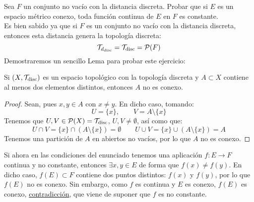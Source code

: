 \begin{ejercicio}
Sea \( F \) un conjunto no vacío con la distancia discreta. Probar que si \( E \) es un espacio métrico conexo, toda función continua de \( E \) en \( F \) es constante.\\

\noindent
Es bien sabido ya que si $F$ es un conjunto no vacío con la distancia discreta, entonces esta distancia genera la topología discreta:
\begin{equation*}
    \mathcal{T}_{d_{\text{disc}}} = \mathcal{T}_{\text{disc}} = \mathcal{P}(F)
\end{equation*}
Demostraremos un sencillo Lema para probar este ejercicio:

\begin{lema*}
    Si $(X,\mathcal{T}_{\text{disc}})$ es un espacio topológico con la topología discreta y $A\subset X$ contiene al menos dos elementos distintos, entonces $A$ no es conexo.
    \begin{proof}
        Sean, pues $x,y\in A$ con $x\neq y$. En dicho caso, tomando:
        \begin{equation*}
            U = \{x\}, \qquad V = A\setminus \{x\}
        \end{equation*}
        Tenemos que $U,V \in \mathcal{P}(X) = \mathcal{T}_{\text{disc}}$, $U,V \neq \emptyset $, así como que:
        \begin{equation*}
            U\cap V = \{x\} \cap (A\setminus \{x\}) = \emptyset \qquad U\cup V = \{x\}\cup (A\setminus \{x\}) = A
        \end{equation*}
        Tenemos una partición de $A$ en abiertos no vacíos, por lo que $A$ no es conexo.
    \end{proof}
\end{lema*}

\noindent
Si ahora en las condiciones del enunciado tenemos una aplicación $f:E\rightarrow F$ continua y no constante, entonces $\exists x,y\in E$ de forma que $f(x) \neq f(y)$. En dicho caso, $f(E)\subset F$ contiene dos puntos distintos: $f(x)$ y $f(y)$, por lo que $f(E)$ no es conexo. Sin embargo, como $f$ es continua y $E$ es conexo, $f(E)$ es conexo, \underline{contradicción}, que viene de suponer que $f$ es no constante.
\end{ejercicio}

